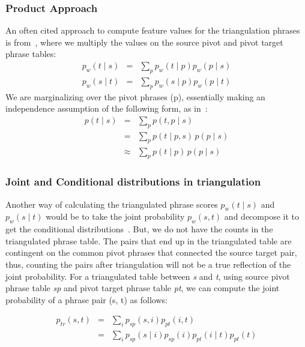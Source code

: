 \documentclass[11pt]{article}
\begin{document}
\subsubsection{Product Approach}
	
	An often cited approach to compute feature values for the triangulation phrases is from~\cite{Utiyama:07}, where we multiply the values on the source pivot and pivot target phrase tables:
	\begin{eqnarray} 
	    \label{eq:forward}
        p_w(t \mid s) &=& \sum_{p} p_w(t \mid p) p_w(p \mid s) \\
        \label{eq:backward}
        p_w(s \mid t) &=& \sum_{p} p_w(s \mid p) p_w(p \mid t)
	\end{eqnarray}
	We are marginalizing over the pivot phrases (p), essentially making an independence assumption of the following form, as in~\cite{Cohn:07}:  
	\begin{eqnarray*}
		p(t \mid s)&=&\sum_{p}{p(t, p \mid s)}\\
		&=& \sum_{p}{p(t \mid p, s)\,p(p \mid s)}\\
		&\approx& \sum_{p}{p(t \mid p)\,p(p \mid s)}
	\end{eqnarray*}

\subsubsection{Joint and Conditional distributions in triangulation}
\label{sec:joint}
	Another way of calculating the triangulated phrase scores $p_{w}(t \mid s)$ and $p_{w}(s \mid t)$ would be to take the joint probability $p_{w}(s, t)$ and decompose it to get the conditional distributions~\cite{Cohn:07}. But, we do not have the counts in the triangulated phrase table. The pairs that end up in the triangulated table are contingent on the common pivot phrases that connected the source target pair, thus, counting the pairs after triangulation will not be a true reflection of the joint probability. For a triangulated table between \emph{s} and \emph{t}, using source pivot phrase table \emph{sp} and pivot target phrase table \emph{pt}, we can compute the joint probability of a phrase pair (s, t) as follows: 

	\begin{eqnarray*}
		p_{tr}(s, t) &=& \sum_{i}p_{sp}(s, i) p_{pt}(i, t) \\
				&=& \sum_{i}p_{sp}(s \mid i) p_{sp}(i) p_{pt}(i \mid t) p_{pt}(t)
	\end{eqnarray*} 
	
\end{document}

